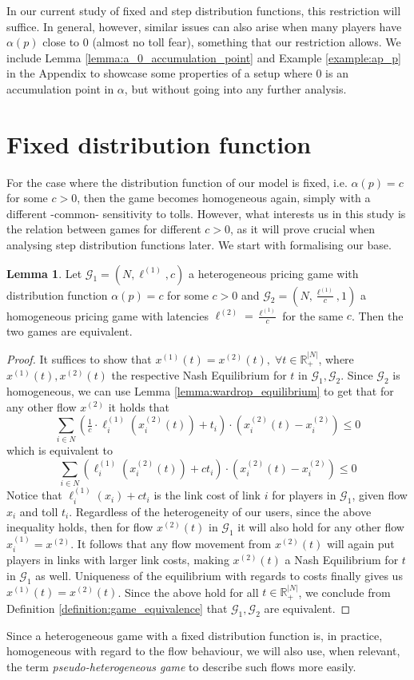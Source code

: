 \documentclass[10pt,a4paper]{book}
\newcommand{\R}{\mathbb{R}}
\newcommand{\Gm}{\mathcal{G}}
\theoremstyle{definition}
\newtheorem{lemma}[definition]{Lemma}
\theoremstyle{comment}
\begin{document}
In our current study of fixed and step distribution functions, this restriction will suffice.
In general, however, similar issues can also arise when many players have $\alpha(p)$ close to $0$ (almost no toll fear), something that our restriction allows.
We include Lemma \ref{lemma:a_0_accumulation_point} and Example \ref{example:ap_p} in the Appendix to showcase some properties of a setup where $0$ is an accumulation point in $\alpha$, but without going into any further analysis.

\section{Fixed distribution function}

For the case where the distribution function of our model is fixed, i.e. $\alpha(p) = c$ for some $c > 0$, then the game becomes homogeneous again, simply with a different -common- sensitivity to tolls.
However, what interests us in this study is the relation between games for different $c > 0$, as it will prove crucial when analysing step distribution functions later.
We start with formalising our base.

\begin{lemma}
	\label{lemma:a_fixed_homogeneous}
	Let $\Gm_1 = (N, \ell^{(1)}, c)$ a heterogeneous pricing game with distribution function $\alpha(p) = c$ for some $c > 0$ and $\Gm_2 = (N, \frac{\ell^{(1)}}{c}, 1)$ a homogeneous pricing game with latencies $\ell^{(2)} = \frac{\ell^{(1)}}{c}$ for the same $c$.
	Then the two games are equivalent.
\end{lemma}

\begin{proof}
	It suffices to show that $x^{(1)}(t) = x^{(2)}(t), \; \forall t \in \R_+^{|N|}$, where $x^{(1)}(t), x^{(2)}(t)$ the respective Nash Equilibrium for $t$ in $\Gm_1, \Gm_2$.
	Since $\Gm_2$ is homogeneous, we can use Lemma \ref{lemma:wardrop_equilibrium} to get that for any other flow $x^{(2)}$ it holds that
	\[
		\sum_{i \in N} \left(\tfrac1c \cdot \ell_i^{(1)}(x_i^{(2)}(t)) + t_i\right) \cdot \left(x_i^{(2)}(t) - x_i^{(2)}\right) \leq 0
	\]
	which is equivalent to
	\[
		\sum_{i \in N} \left(\ell_i^{(1)}(x_i^{(2)}(t)) + c t_i\right) \cdot \left(x_i^{(2)}(t) - x_i^{(2)}\right) \leq 0
	\]
	Notice that $\ell_i^{(1)}(x_i) + c t_i$ is the link cost of link $i$ for players in $\Gm_1$, given flow $x_i$ and toll $t_i$.
	Regardless of the heterogeneity of our users, since the above inequality holds, then for flow $x^{(2)}(t)$ in $\Gm_1$ it will also hold for any other flow $x_i^{(1)} = x^{(2)}$.
	It follows that any flow movement from $x^{(2)}(t)$ will again put players in links with larger link costs, making $x^{(2)}(t)$ a Nash Equilibrium for $t$ in $\Gm_1$ as well.
	Uniqueness of the equilibrium with regards to costs finally gives us $x^{(1)}(t) = x^{(2)}(t)$.
	Since the above hold for all $t \in \R_+^{|N|}$, we conclude from Definition \ref{definition:game_equivalence} that $\Gm_1, \Gm_2$ are equivalent.
\end{proof}
Since a heterogeneous game with a fixed distribution function is, in practice, homogeneous with regard to the flow behaviour, we will also use, when relevant, the term \textit{pseudo-heterogeneous game} to describe such flows more easily.
\end{document}
